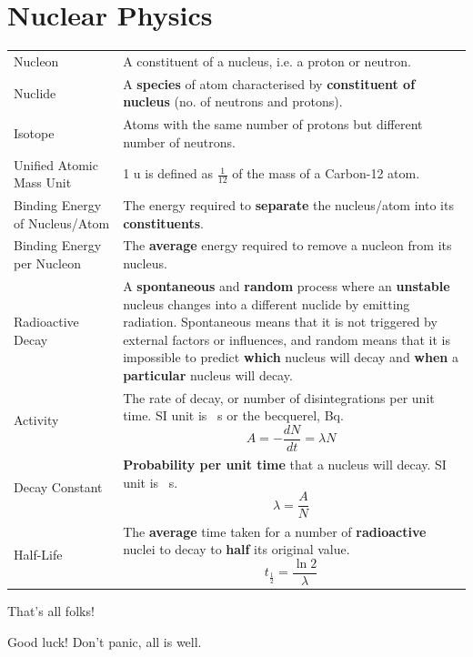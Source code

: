 \documentclass[a4paper,11pt]{article}
\begin{document}
	\section{Nuclear Physics}
	\begin{center}
		\renewcommand{\arraystretch}{1.25}
		\begin{tabular}{@{} l p{10cm} @{}}
			\toprule
			Nucleon & A constituent of a nucleus, i.e. a proton or neutron.\\
			Nuclide & A \textbf{species} of atom characterised by \textbf{constituent of nucleus} (no. of neutrons and protons).\\
			Isotope & Atoms with the same number of protons but different number of neutrons.\\
			Unified Atomic Mass Unit & 1 u is defined as $\frac{1}{12}$ of the mass of a Carbon-12 atom.\\
			Binding Energy of Nucleus/Atom & The energy required to \textbf{separate} the nucleus/atom into its \textbf{constituents}.\\
			Binding Energy per Nucleon & The \textbf{average} energy required to remove a nucleon from its nucleus.\\
			Radioactive Decay & A \textbf{spontaneous} and \textbf{random} process where an \textbf{unstable} nucleus changes into a different nuclide by emitting radiation. Spontaneous means that it is not triggered by external factors or influences, and random means that it is impossible to predict \textbf{which} nucleus will decay and \textbf{when} a \textbf{particular} nucleus will decay.\\
			Activity & The rate of decay, or number of disintegrations per unit time. SI unit is \si{\per\second} or the becquerel, \si{\becquerel}. $$A = -\frac{dN}{dt} = \lambda N$$ \vspace*{-\baselineskip}\\
			Decay Constant & \textbf{Probability per unit time} that a nucleus will decay. SI unit is \si{\per\second}. $$\lambda = \frac{A}{N}$$ \vspace*{-\baselineskip}\\
			Half-Life & The \textbf{average} time taken for a number of \textbf{radioactive} nuclei to decay to \textbf{half} its original value. $$t_{\frac{1}{2}} = \frac{\ln 2}{\lambda}$$ \vspace*{-\baselineskip}\\
			\bottomrule
		\end{tabular}
	\end{center}
	\vspace{2cm}
	\begin{center}
		{\LARGE That's all folks!}
		
		{\huge Good luck! Don't panic, all is well.}
	\end{center}
\end{document}
